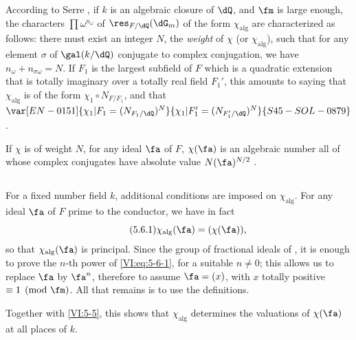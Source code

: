According to Serre , if $k$ is an algebraic closure of 
$\dQ$, and $\fm$ is large enough, the characters $\prod \omega^{n_\omega}$ 
of $\res_{F/\dQ}(\dG_m)$ of the form $\chi_\text{alg}$ are characterized 
as follows: there must exist an integer $N$, the \emph{weight} of $\chi$ (or 
$\chi_\text{alg}$), such that for any element $\sigma$ of $\gal(k/\dQ)$ 
conjugate to complex conjugation, we have $n_\omega+n_{\sigma \omega}=N$. If 
$F_1$ is the largest subfield of $F$ which is a quadratic extension 
that is totally imaginary over a totally real field $F_1'$, this amounts to 
  saying that $\chi_\text{alg}$ is of the form $\chi_1\circ N_{F/F_1}$, and that 
  $\var[EN-0151]{\chi_1|F_1=(N_{F_1/\dQ})^N}{\chi_1|F_1'=(N_{F_1'/\dQ})^N}{S45-SOL-0879}$. 

If $\chi$ is of weight $N$, for any ideal $\fa$ of $F$, $\chi(\fa)$ is an algebraic number all of whose complex conjugates have absolute value 
$N(\fa)^{N/2}$ . 





\subsection{}\label{VI:5-6}

For a fixed number field $k$, additional conditions are 
imposed on $\chi_\text{alg}$. For any ideal $\fa$ of $F$ prime to the 
conductor, we have in fact 
\begin{equation*}\tag{5.6.1}\label{VI:eq:5-6-1}
  \chi_\text{alg}(\fa) = (\chi(\fa)) \text{,} 
\end{equation*}
so that $\chi_\text{alg}(\fa)$ is principal. Since the group of fractional ideals of , it is enough to prove the $n$-th power 
of \eqref{VI:eq:5-6-1}, for a suitable $n\ne 0$; this allows us 
to replace $\fa$ by $\fa^n$, therefore to assume $\fa=(x)$, with $x$ totally 
positive $\equiv 1\pmod\fm$. All that remains is to use the definitions. 

Together with \ref{VI:5-5}, this shows that $\chi_\text{alg}$ determines the 
valuations of $\chi(\fa)$ at all places of $k$. 





\subsection{}\label{VI:5-7}

